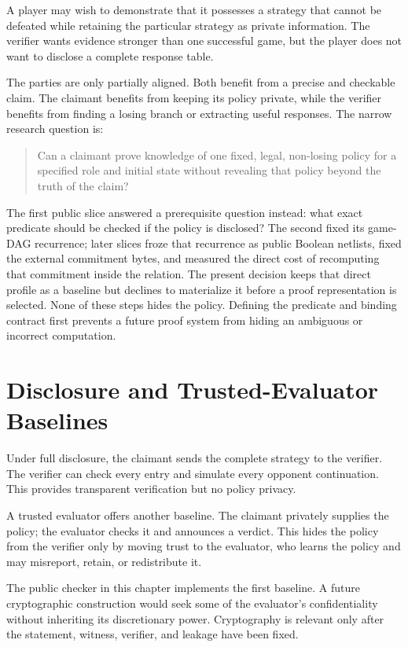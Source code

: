 A player may wish to demonstrate that it possesses a strategy that cannot be
defeated while retaining the particular strategy as private information. The
verifier wants evidence stronger than one successful game, but the player does
not want to disclose a complete response table.

The parties are only partially aligned. Both benefit from a precise and
checkable claim. The claimant benefits from keeping its policy private, while
the verifier benefits from finding a losing branch or extracting useful
responses. The narrow research question is:

\begin{quote}
Can a claimant prove knowledge of one fixed, legal, non-losing policy for a
specified role and initial state without revealing that policy beyond the
truth of the claim?
\end{quote}

The first public slice answered a prerequisite question instead: what exact
predicate should be checked if the policy is disclosed? The second fixed its
game-DAG recurrence; later slices froze that recurrence as public Boolean
netlists, fixed the external commitment bytes, and measured the direct cost of
recomputing that commitment inside the relation. The present decision keeps
that direct profile as a baseline but declines to materialize it before a
proof representation is selected. None of these steps hides the policy.
Defining the predicate and binding contract first prevents a future proof
system from hiding an ambiguous or incorrect computation.

\section{Disclosure and Trusted-Evaluator Baselines}
\label{sec:ttt-baselines}

Under full disclosure, the claimant sends the complete strategy to the
verifier. The verifier can check every entry and simulate every opponent
continuation. This provides transparent verification but no policy privacy.

A trusted evaluator offers another baseline. The claimant privately supplies
the policy; the evaluator checks it and announces a verdict. This hides the
policy from the verifier only by moving trust to the evaluator, who learns the
policy and may misreport, retain, or redistribute it.

The public checker in this chapter implements the first baseline. A future
cryptographic construction would seek some of the evaluator's confidentiality
without inheriting its discretionary power. Cryptography is relevant only
after the statement, witness, verifier, and leakage have been fixed.

